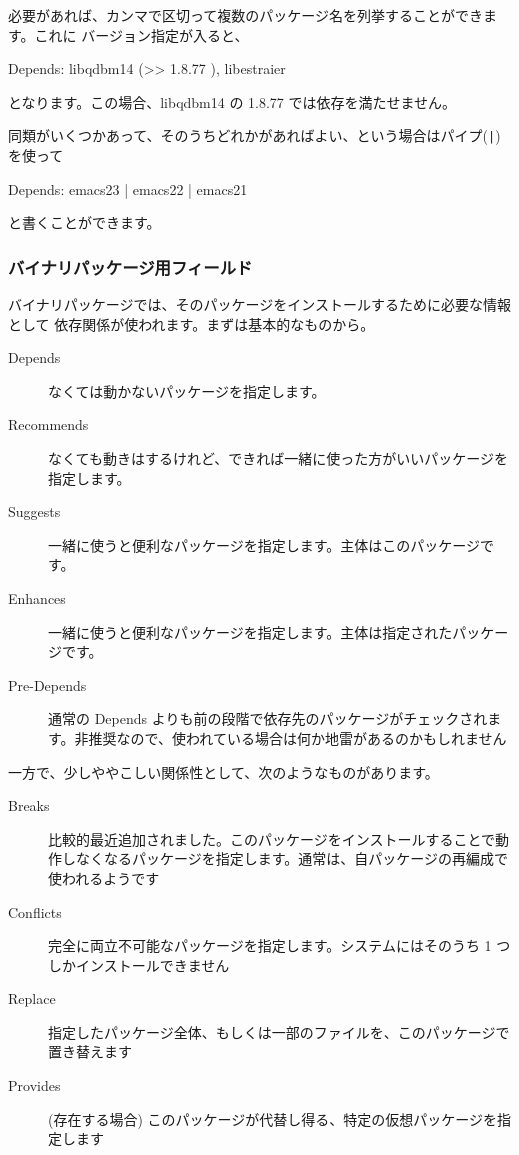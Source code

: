 \documentclass[mingoth,a4paper]{jsarticle}
\begin{document}
必要があれば、カンマで区切って複数のパッケージ名を列挙することができます。これに
バージョン指定が入ると、

\begin{commandline}
Depends: libqdbm14 (>> 1.8.77 ), libestraier
\end{commandline}

となります。この場合、libqdbm14 の 1.8.77 では依存を満たせません。

同類がいくつかあって、そのうちどれかがあればよい、という場合はパイプ(\verb+|+)を使って

\begin{commandline}
Depends: emacs23 | emacs22 | emacs21
\end{commandline}

と書くことができます。

\subsubsection{バイナリパッケージ用フィールド}

バイナリパッケージでは、そのパッケージをインストールするために必要な情報として
依存関係が使われます。まずは基本的なものから。

\begin{description}
\item[Depends] なくては動かないパッケージを指定します。
\item[Recommends] なくても動きはするけれど、できれば一緒に使った方がいいパッケージを指定します。
\item[Suggests] 一緒に使うと便利なパッケージを指定します。主体はこのパッケージです。
\item[Enhances] 一緒に使うと便利なパッケージを指定します。主体は指定されたパッケージです。
\item[Pre-Depends] 通常の Depends よりも前の段階で依存先のパッケージがチェックされます。非推奨なので、使われている場合は何か地雷があるのかもしれません
\end{description}

一方で、少しややこしい関係性として、次のようなものがあります。

\begin{description}
\item[Breaks] 比較的最近追加されました。このパッケージをインストールすることで動作しなくなるパッケージを指定します。通常は、自パッケージの再編成で使われるようです
\item[Conflicts]完全に両立不可能なパッケージを指定します。システムにはそのうち 1 つしかインストールできません
\item[Replace] 指定したパッケージ全体、もしくは一部のファイルを、このパッケージで置き替えます
\item[Provides] (存在する場合) このパッケージが代替し得る、特定の仮想パッケージを指定します
\end{description}
\end{document}

